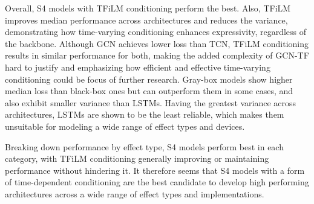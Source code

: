 Overall, S4 models with TFiLM conditioning perform the best.
Also, TFiLM improves median performance across architectures and reduces the variance, demonstrating how time-varying conditioning enhances expressivity, regardless of the backbone.
Although GCN achieves lower loss than TCN, TFiLM conditioning results in similar performance for both, making the added complexity of GCN-TF hard to justify and emphasizing how efficient and effective time-varying conditioning could be focus of further research.
Gray-box models show higher median loss than black-box ones but can outperform them in some cases, and also exhibit smaller variance than LSTMs.
Having the greatest variance across architectures, LSTMs are shown to be the least reliable, which makes them unsuitable for modeling a wide range of effect types and devices.

Breaking down performance by effect type, S4 models perform best in each category, with TFiLM conditioning generally improving or maintaining performance without hindering it.
It therefore seems that S4 models with a form of time-dependent conditioning are the best candidate to develop high performing architectures across a wide range of effect types and implementations.

